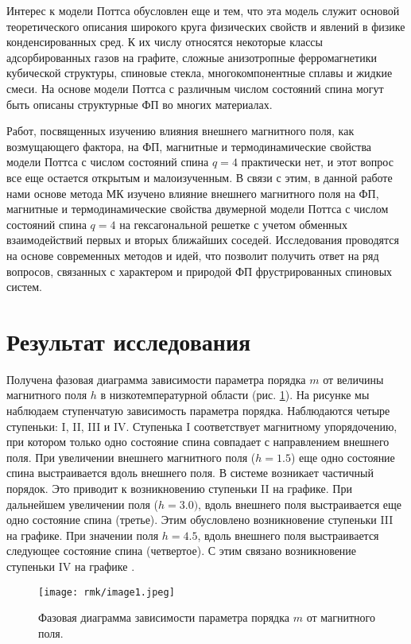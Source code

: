 Интерес к модели Поттса обусловлен еще и тем, что эта модель служит основой теоретического описания широкого круга физических свойств и явлений в физике конденсированных сред. К их числу относятся некоторые классы адсорбированных газов на графите, сложные анизотропные ферромагнетики кубической структуры, спиновые стекла, многокомпонентные сплавы и жидкие смеси. На основе модели Поттса с различным числом состояний спина могут быть описаны структурные ФП во многих материалах.

Работ, посвященных изучению влияния внешнего магнитного поля, как возмущающего фактора, на ФП, магнитные и термодинамические свойства модели Поттса с числом состояний спина $q = 4$ практически нет, и этот вопрос все еще остается открытым и малоизученным. В связи с этим, в данной работе нами основе метода МК изучено влияние внешнего магнитного поля на ФП, магнитные и термодинамические свойства двумерной модели Поттса с числом состояний спина $q = 4$ на гексагональной решетке с учетом обменных взаимодействий первых и вторых ближайших соседей. Исследования проводятся на основе современных методов и идей, что позволит получить ответ на ряд вопросов, связанных с характером и природой ФП фрустрированных спиновых систем.


\section{Результат исследования}

Получена фазовая диаграмма зависимости параметра порядка $m$ от величины магнитного поля $h$ в низкотемпературной области (рис. \ref{rmk-fig-1}). На рисунке мы наблюдаем ступенчатую зависимость параметра порядка. Наблюдаются четыре ступеньки: I, II, III и IV. Ступенька I соответствует магнитному упорядочению, при котором только одно состояние спина совпадает с направлением внешнего поля. При увеличении внешнего магнитного поля ($h = 1.5$) еще одно состояние спина выстраивается вдоль внешнего поля. В системе возникает частичный порядок. Это приводит к возникновению ступеньки II на графике. При дальнейшем увеличении поля ($h = 3.0)$, вдоль внешнего поля выстраивается еще одно состояние спина (третье). Этим обусловлено возникновение ступеньки III на графике. При значении поля $h = 4.5$, вдоль внешнего поля выстраивается следующее состояние спина (четвертое). С этим связано возникновение ступеньки IV на графике \cite{rmk-bib-4}.
\begin{figure}[h]
    \begin{center}
        \texttt{[image: rmk/image1.jpeg]}
    \end{center}
    \caption{Фазовая диаграмма зависимости параметра порядка $m$ от магнитного поля.}
    \label{rmk-fig-1}
\end{figure}

